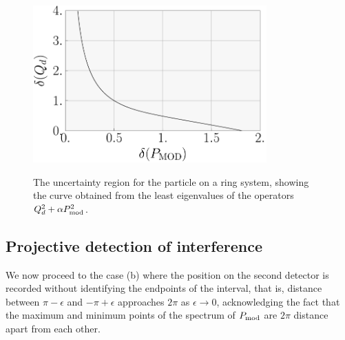 \begin{figure}
  \begin{center}
  \includegraphics[width=0.8\textwidth]{ring-ur}
  \label{fig:ring-ur}
  \end{center}
  \caption{The uncertainty region for the particle on a ring system, showing the curve obtained from the least eigenvalues of the operators $Q_d^2 + \alpha P_{\mathrm{mod}}^2$.}
\end{figure}

\subsection{Projective detection of interference}

We now proceed to the case (b) where the position on the second detector is recorded without identifying the endpoints of the interval, that is, distance between $\pi-\epsilon$ and $-\pi+\epsilon$ approaches $2\pi$ as $\epsilon\rightarrow 0$, acknowledging the fact that the maximum and minimum points of the spectrum of $P_{\mathrm{mod}}$ are $2\pi$ distance apart from each other.

